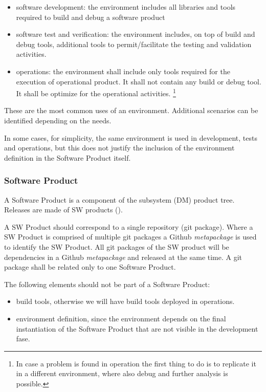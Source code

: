 \begin{itemize}
\item software development: the environment includes all libraries and tools required to build and debug a software product
\item software test and verification: the environment includes, on top of build and debug tools, additional tools to permit/facilitate the testing and validation activities.
\item operations: the environment shall include only tools required for the execution of operational product. It shall not contain any build or debug tool. It shall be optimize for the operational activities. \footnote{In case a problem is found in operation the first thing to do is to replicate it in a different environment, where also debug and further analysis is possible.}
\end{itemize}

These are the most common uses of an environment. Additional scenarios can be identified depending on the needs.

In some cases, for simplicity, the same environment is used in development, tests and operations, but this does not justify the inclusion of the environment definition in the Software Product itself.


\subsubsection{Software Product} \label{sec:swdef}

A Software Product is a component of the subsystem (DM) product tree.
Releases are made of  SW products ().

A SW Product should correspond to a single repository (git package).
Where a SW Product is comprised of multiple git packages
a Github \textit{metapackage} is used to identify the SW Product.
All git packages of the SW product will be dependencies in a Github \textit{metapackage} and released at the same time.
A git package shall be related only to one Software Product.

The following elements should not be part of a Software Product:

\begin{itemize}
\item build tools, otherwise we will have build tools deployed in operations.
\item environment definition, since the environment depends on the final instantiation of the Software Product that are not visible in the development fase.
\end{itemize}

